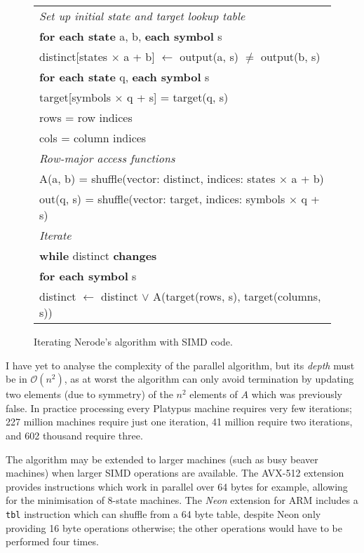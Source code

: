 \begin{figure}
  \begin{center}
    \begin{tabular}{l}
      \emph{Set up initial state and target lookup table} \\
      \textbf{for each state} a, b, \textbf{each symbol} s \\
      \quad distinct[states $\times$ a + b] $\leftarrow$ output(a, s) $\neq$ output(b, s) \\
      \textbf{for each state} q, \textbf{each symbol} s \\
      \quad target[symbols $\times$ q + s] = target(q, s) \\
      rows = row indices \\
      cols = column indices \\
      \emph{Row-major access functions} \\
      A(a, b) = shuffle(vector: distinct, indices: states $\times$ a + b) \\
      out(q, s) = shuffle(vector: target, indices: symbols $\times$ q + s) \\
      \emph{Iterate} \\
      \textbf{while} distinct \textbf{changes} \\
      \quad \textbf{for each symbol} s \\
      \quad\quad distinct $\leftarrow$ distinct $\lor$ A(target(rows, s), target(columns, s))
    \end{tabular}
  \end{center}
  \caption{Iterating Nerode's algorithm with SIMD code.}
  \label{fig:nerode}
\end{figure}

I have yet to analyse the complexity of the parallel algorithm, but its
\emph{depth} must be in $\mathcal{O}(n^2)$, as at worst the algorithm
can only avoid termination by updating two elements (due to symmetry)
of the $n^2$ elements of $A$ which was previously false.
In practice processing every Platypus machine requires very few
iterations; 227 million machines require just one iteration, 41 million
require two iterations, and 602 thousand require three.

The algorithm may be extended to larger machines
(such as busy beaver machines) when larger SIMD operations are
available. The AVX-512 extension provides instructions
which work in parallel over 64 bytes for example, allowing for the
minimisation of 8-state machines. The \emph{Neon} extension for
ARM includes a \texttt{tbl} instruction which can shuffle from a 64
byte table, despite Neon only providing 16 byte operations otherwise;
the other operations would have to be performed four times.

